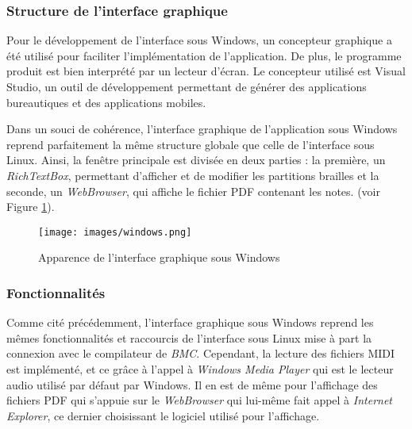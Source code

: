 

\subsubsection{Structure de l'interface graphique}

Pour le développement de l'interface sous Windows, un concepteur graphique a été utilisé pour faciliter l'implémentation de l'application. De plus, le programme produit est bien interprété par un lecteur d'écran. Le concepteur utilisé est Visual Studio, un outil de développement permettant de générer des applications bureautiques et des applications mobiles.

Dans un souci de cohérence, l'interface graphique de l'application sous Windows reprend parfaitement la même structure globale que celle de l'interface sous Linux. Ainsi, la fenêtre principale est divisée en deux parties : la première, un \textit{RichTextBox}, permettant d'afficher et de modifier les partitions brailles et la seconde, un \textit{WebBrowser}, qui affiche le fichier PDF contenant les notes. (voir Figure \ref{windows}).

\begin{figure}[!h]
\begin{center}
  \texttt{[image: images/windows.png]}
  \caption{Apparence de l'interface graphique sous Windows}
  \label{windows}
\end{center}
\end{figure}

\subsubsection{Fonctionnalités}

Comme cité précédemment, l'interface graphique sous Windows reprend les mêmes fonctionnalités et raccourcis de l'interface sous Linux mise à part la connexion avec le compilateur de \textit{BMC}. Cependant, la lecture des fichiers MIDI est implémenté, et ce grâce à l'appel à \textit{Windows Media Player} qui est le lecteur audio utilisé par défaut par Windows. Il en est de même pour l'affichage des fichiers PDF qui s'appuie sur le \textit{WebBrowser} qui lui-même fait appel à \textit{Internet Explorer}, ce dernier choisissant le logiciel utilisé pour l'affichage.
